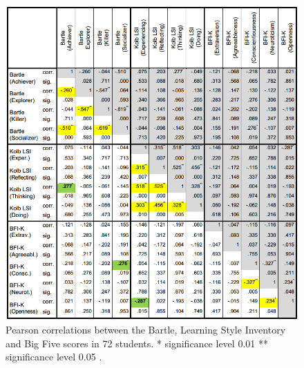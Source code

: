 \documentclass[12pt,a4paper,twoside]{report}
\begin{document}
\begin{figure}
\begin{center}
	\includegraphics[width=1\textwidth]{../img/bartle-big5.png}
	\caption{Pearson correlations between the Bartle, Learning Style Inventory and Big Five scores in 72 students. * significance level 0.01 ** significance level 0.05  \cite{konertmodeling}.}
	\label{correlation}
\end{center}
\end{figure}
\end{document}
